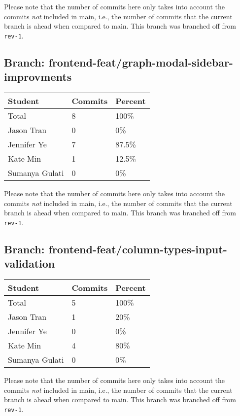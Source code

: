 \documentclass{article}
\begin{document}
Please note that the number of commits here only takes into account the commits \emph{not}
included in main, i.e., the number of commits that the current branch is ahead when compared 
to main. This branch was branched off from \texttt{rev-1}.

\subsection{Branch: frontend-feat/graph-modal-sidebar-improvments}

\begin{table}[H]
\centering
\begin{tabular}{lll}
\toprule
\textbf{Student} & \textbf{Commits} & \textbf{Percent}\\
\midrule
Total & 8 & 100\% \\
Jason Tran & 0 & 0\% \\
Jennifer Ye & 7 & 87.5\% \\
Kate Min & 1 & 12.5\% \\
Sumanya Gulati & 0 & 0\% \\
\bottomrule
\end{tabular}
\end{table}

Please note that the number of commits here only takes into account the commits \emph{not}
included in main, i.e., the number of commits that the current branch is ahead when compared 
to main. This branch was branched off from \texttt{rev-1}.

\subsection{Branch: frontend-feat/column-types-input-validation}

\begin{table}[H]
\centering
\begin{tabular}{lll}
\toprule
\textbf{Student} & \textbf{Commits} & \textbf{Percent}\\
\midrule
Total & 5 & 100\% \\
Jason Tran & 1 & 20\% \\
Jennifer Ye & 0 & 0\% \\
Kate Min & 4 & 80\% \\
Sumanya Gulati & 0 & 0\% \\
\bottomrule
\end{tabular}
\end{table}

Please note that the number of commits here only takes into account the commits \emph{not}
included in main, i.e., the number of commits that the current branch is ahead when compared 
to main. This branch was branched off from \texttt{rev-1}.
\end{document}
